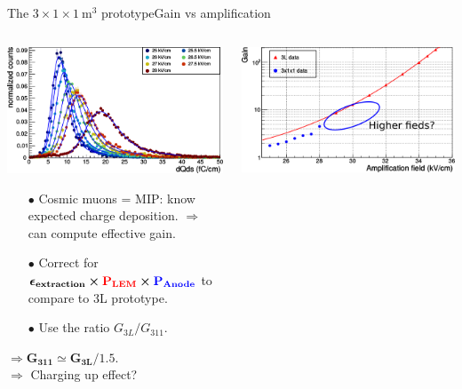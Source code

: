 \documentclass[10pt]{beamer}
\begin{document}
    \begin{frame}{The \texorpdfstring{$3 \times 1 \times \SI{1}{\meter\cubed}$}{311} prototype}{Gain vs amplification}
    	\begin{scriptsize}
    		\begin{columns}
    			\begin{column}{0.5\textwidth}
    				\includegraphics[width=\textwidth]{figures/311/dQds_gain.png}\\
    				\vfill
    				\begin{itemize}
    					\item[$\bullet$] Cosmic muons = MIP: know expected charge deposition. $\Rightarrow$ can compute effective gain.
    					\item[$\bullet$] Correct for $\mathbf{\boldsymbol{\epsilon}_{extraction}\boldsymbol{\times}\textcolor{red}{P_{LEM}}\boldsymbol{\times} \textcolor{blue}{P_{Anode}}}$ to compare to 3L prototype.
    					\item[$\bullet$] Use the ratio $G_{3L}/G_{311}$.
    				\end{itemize}
    				$\mathbf{\Rightarrow G_{311} \boldsymbol{\simeq} G_{3L}/1.5}$.\\
    				$\Rightarrow$ Charging up effect?\\
    			\end{column}
    			\hfill
    			\begin{column}{0.5\textwidth}
    				\centering
    				\includegraphics[width=.9\textwidth]{figures/311/gain_311_circle.png}\\

\end{column}
\end{columns}
\end{scriptsize}
\end{frame}
\end{document}

